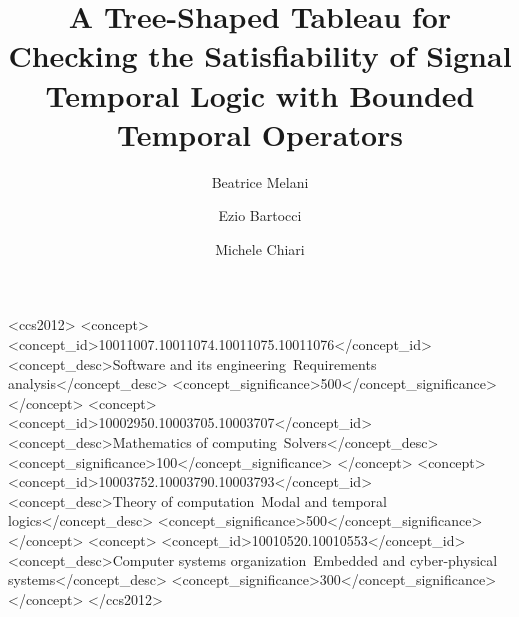 \documentclass[acmsmall,screen]{acmart}
\begin{document}
\title{A Tree-Shaped Tableau for Checking the Satisfiability of Signal Temporal Logic with Bounded Temporal Operators}

\author{Beatrice Melani}

\author{Ezio Bartocci}

\author{Michele Chiari}


\begin{CCSXML}
<ccs2012>
   <concept>
       <concept_id>10011007.10011074.10011075.10011076</concept_id>
       <concept_desc>Software and its engineering~Requirements analysis</concept_desc>
       <concept_significance>500</concept_significance>
       </concept>
   <concept>
       <concept_id>10002950.10003705.10003707</concept_id>
       <concept_desc>Mathematics of computing~Solvers</concept_desc>
       <concept_significance>100</concept_significance>
       </concept>
   <concept>
       <concept_id>10003752.10003790.10003793</concept_id>
       <concept_desc>Theory of computation~Modal and temporal logics</concept_desc>
       <concept_significance>500</concept_significance>
       </concept>
   <concept>
       <concept_id>10010520.10010553</concept_id>
       <concept_desc>Computer systems organization~Embedded and cyber-physical systems</concept_desc>
       <concept_significance>300</concept_significance>
       </concept>
 </ccs2012>
\end{CCSXML}


\end{document}
